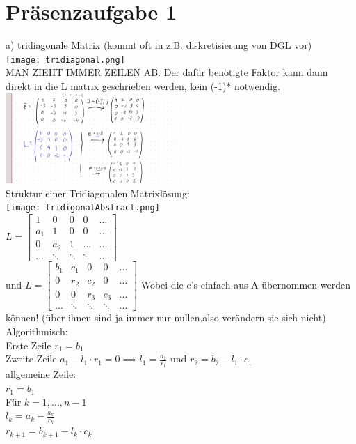 \documentclass{article}
\begin{document}
	\section{Präsenzaufgabe 1}
	a) tridiagonale Matrix (kommt oft in z.B. diskretisierung von DGL vor)\\
	\texttt{[image: tridiagonal.png]}\\
	MAN ZIEHT IMMER ZEILEN AB. Der dafür benötigte Faktor kann dann direkt in die L matrix geschrieben werden, kein (-1)* notwendig.\\
	\includegraphics[width=256px]{LösungTridigonal.png}\\
	Struktur einer Tridiagonalen Matrixlösung:\\
	\texttt{[image: tridigonalAbstract.png]}\\
	$L =\begin{bmatrix}1&0&0&0&\hdots\\
		a_1&1&0&0&\hdots\\
		0&a_2&1&\dots&\hdots\\
		\hdots&\ddots&\ddots&\ddots&\hdots\end{bmatrix}$
	\\
	und
	$L =\begin{bmatrix}b_1&c_1&0&0&\hdots\\
		0&r_2&c_2&0&\hdots\\
		0&0&r_3&c_3&\hdots\\
		\hdots&\ddots&\ddots&\ddots&\hdots\end{bmatrix}$
	Wobei die c's einfach aus A übernommen werden können! (über ihnen sind ja immer nur nullen,also verändern sie sich nicht).\\
	Algorithmisch:\\
	Erste Zeile $r_1 = b_1$\\
	Zweite Zeile $a_1-l_1\cdot r_1 = 0\implies l_1 =\frac{a_1}{r_1}$ und $r_2 = b_2-l_1\cdot c_1$\\
	allgemeine Zeile:\\
	$r_1=b_1$\\
	Für $k=1,\dots,n-1$\\
	$l_k = a_k-\frac{a_k}{r_k}$\\
	$r_{k+1} = b_{k+1}-l_k\cdot c_k$\\
\end{document}
